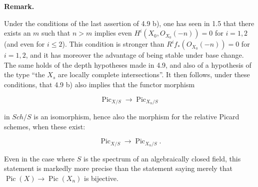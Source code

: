 \documentclass[
]{article}
\begin{document}
\textbf{Remark.}

Under the conditions of the last assertion of 4.9 b), one has seen in
1.5 that there exists an \(m\) such that \(n > m\) implies even
\(H^{i}(X_{0}, O_{X_{0}}(-n)) = 0\) for \(i = 1, 2\) (and even for
\(i \leqslant 2\)). This condition is stronger than
\(R^{i}f_{\ast}(O_{X_{0}}(-n)) = 0\) for \(i = 1, 2\), and it has
moreover the advantage of being stable under base change. The same holds
of the depth hypotheses made in 4.9, and also of a hypothesis of the
type ``the \(X_{s}\) are locally complete intersections''. It then
follows, under these conditions, that 4.9 b) also implies that the
functor morphism

\[
\operatorname{Pic}_{X/S} \to \operatorname{Pic}_{X_{n}/S}
\]

in \(Sch/S\) is an isomorphism, hence also the morphism for the relative
Picard schemes, when these exist:

\[
\operatorname{Pic}_{X/S} \to \operatorname{Pic}_{X_{n}/S}.
\]

Even in the case where \(S\) is the spectrum of an algebraically closed
field, this statement is markedly more precise than the statement saying
merely that \(\operatorname{Pic}(X) \to \operatorname{Pic}(X_{n})\) is
bijective.
\end{document}
